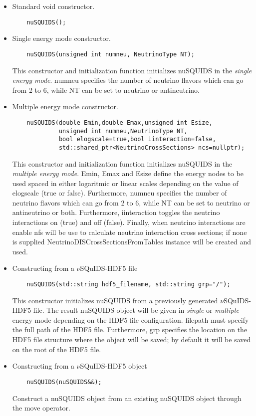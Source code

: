\begin{itemize}
\item Standard void constructor.
  \begin{lstlisting}
    nuSQUIDS();
  \end{lstlisting}
\item Single energy mode constructor.
  \begin{lstlisting}
    nuSQUIDS(unsigned int numneu, NeutrinoType NT);
  \end{lstlisting}
This constructor and initialization function initializes {\ttfamily nuSQUIDS} in the
{\it single energy mode}. {\ttfamily numneu} specifies the number of neutrino flavors which can go from 2 to 6, while {\ttfamily NT} can be set to  {\ttfamily neutrino} or {\ttfamily antineutrino}.
\item Multiple energy mode constructor.
  \begin{lstlisting}
    nuSQUIDS(double Emin,double Emax,unsigned int Esize,
             unsigned int numneu,NeutrinoType NT,
             bool elogscale=true,bool iinteraction=false, 
             std::shared_ptr<NeutrinoCrossSections> ncs=nullptr);
  \end{lstlisting}
This constructor and initialization function initializes {\ttfamily nuSQUIDS} in the
{\it multiple energy mode}. {\ttfamily Emin}, {\ttfamily Emax} and {\ttfamily Esize} define the energy nodes to be used spaced in either {\ttfamily logaritmic} or {\ttfamily linear} scales depending on the value of {\ttfamily elogscale (true or false)}. Furthermore, {\ttfamily numneu} specifies the number of neutrino flavors which can go from 2 to 6, while {\ttfamily NT} can be set to  {\ttfamily neutrino} or {\ttfamily antineutrino} or {\ttfamily both}. Furthermore, {\ttfamily iinteraction} toggles the neutrino interactions {\ttfamily on (true)} and {\ttfamily off (false)}. Finally, when neutrino interactions are enable {\ttfamily nfs} will be use to calculate neutrino interaction cross sections; if none is supplied {\ttfamily NeutrinoDISCrossSectionsFromTables} instance will be created and used.
\item Constructing from a $\nu$SQuIDS-HDF5 file
  \begin{lstlisting}
    nuSQUIDS(std::string hdf5_filename, std::string grp="/");
  \end{lstlisting}
This constructor initializes {\ttfamily nuSQUIDS} from a 
previously generated $\nu$SQuIDS-HDF5 file. The result {\ttfamily nuSQUIDS} 
object will be given in {\it single} or {\it multiple} energy mode depending on the 
HDF5 file configuration. {\ttfamily filepath} must specify the full path of the HDF5 file. Furthermore,
{\ttfamily grp} specifies the location on the HDF5 file structure where the object will be saved; by default
it will be saved on the {\ttfamily root} of the HDF5 file.
\item Constructing from a $\nu$SQuIDS-HDF5 object
  \begin{lstlisting}
    nuSQUIDS(nuSQUIDS&&);
  \end{lstlisting}
Construct a {\ttfamily nuSQUIDS} object from an existing {\ttfamily nuSQUIDS} object through
the {\ttfamily move} operator.
\end{itemize}

